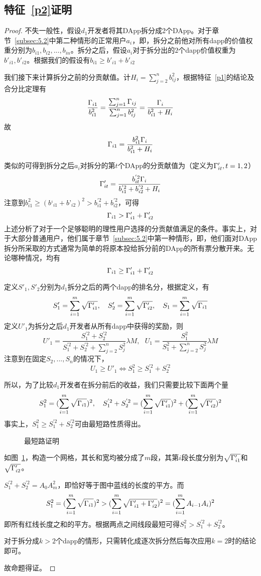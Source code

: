 \subsection{特征~\ref{p2}证明}
\label{subsection:proof2}
\begin{proof}
	 不失一般性，假设$d_1$开发者将其DApp拆分成2个DApp。对于章节~\ref{subsec:5.2}中第二种情形的正常用户$a_i$，即，拆分之前他对所有dapp的价值权重分别为$b_{i1},b_{i2},...,b_{in}$。拆分之后，假设$a_i$对于拆分出的$2$个dapp价值权重为$b'_{i1},b'_{i2}$。根据我们的假设有$b_{i1} \geq b'_{i1}+b'_{i2}$

	 我们接下来计算拆分之前的分贡献值。计$H_i = \sum_{j=2}^n b_{ij}^2$，根据特征~\ref{p1}的结论及合分比定理有
	 $$\frac{\Gamma_{i1}}{b_{i1}^2} = \frac{\sum_{j=1}^n \Gamma_{ij}}{\sum_{j=1}^n b_{ij}^2} = \frac{\Gamma_i}{b_{i1}^2+H_i}$$
	 故
	 $$\Gamma_{i1}=\frac{b_{i1}^2\Gamma_i}{b_{i1}^2+H_i}$$

     类似的可得到拆分之后$a_i$对拆分的第$t$个DApp的分贡献值为（定义为$\Gamma'_{it},t=1,2$）
	 $$\Gamma'_{it} =  \frac{b_{it}^{'2}\Gamma_i}{b_{i1}^{'2}+b_{i2}^{'2}+H_i}$$
	 注意到$b_{i1}^2 \geq (b‘_{i1}+b’_{i2})^2 >b_{i1}^{'2}+b_{i2}^{'2}$，可得
	 $$\Gamma_{i1} > \Gamma'_{i1}+\Gamma'_{i2}$$
	 上述分析了对于一个足够聪明的理性用户选择的分贡献值满足的条件。事实上，对于大部分普通用户，他们属于章节~\ref{subsec:5.2}中第一种情形，即，他们面对DApp拆分所采取的方式通常为简单的将原本投给拆分前的DApp的所有票分散开来。无论哪种情况，均有
	 	$$\Gamma_{i1} \geq \Gamma'_{i1}+\Gamma'_{i2}$$

	 定义$S'_1,S'_2$分别为$d_1$拆分之后的两个dapp的排名分，根据定义，有
	 $$S'_1 =  \sum_{i=1}^m \sqrt{\Gamma'_{i1}},~~~S'_2 =  \sum_{i=1}^m \sqrt{\Gamma'_{i2}},~~~S_1 = \sum_{i=1}^m \sqrt{\Gamma_{i1}}$$
	 定义$U'_1$为拆分之后$d_1$开发者从所有dapp中获得的奖励，则
	 $$U'_1=\frac{S_1^{'2}+S_2^{'2}}{S_1^{'2}+S_2^{'2}+\sum_{j=2}^n S_j^2} \lambda M,~~~U_1=\frac{S^2_1}{S_1^2+\sum_{j=2}^n S_j^2} \lambda M$$
	 注意到在固定$S_2,...,S_n$的情况下，
	 $$ U_1 \geq U'_1 \Leftrightarrow S_1^2 \geq S_1^{'2}+S_2^{'2}$$

	 所以，为了比较$d_1$开发者在拆分前后的收益，我们只需要比较下面两个量
	 $$S_1^2 = (\sum_{i=1}^m \sqrt{\Gamma_{i1}})^2,~~~S_1^{'2}+S_2^{'2}=  (\sum_{i=1}^m \sqrt{\Gamma'_{i1}})^2+(\sum_{i=1}^m \sqrt{\Gamma'_{i2}})^2$$
	 事实上，$S_1^2 \geq S_1^{'2}+S_2^{'2}$可由最短路性质得出。
	 \begin{figure}
	 	\centering
    
	 	\caption{最短路证明 \label{fig:path}}
	 \end{figure}
	 如图~\ref{fig:path}，构造一个网格，其长和宽均被分成了$m$段，其第$i$段长度分别为$\sqrt{\Gamma'_{i1}}$和$\sqrt{\Gamma'_{i2}}$。

	 $S_1^{'2}+S_2^{'2}=A_0A_m^2$，即恰好等于图中蓝线的长度的平方。而
	 $$S_1^2 = (\sum_{i=1}^m \sqrt{\Gamma_{i1}})^2 > (\sum_{i=1}^m \sqrt{\Gamma'_{i1}+\Gamma'_{i2}})^2 = (\sum_{i=1}^m A_{i-1}A_i)^2$$
	 即所有红线长度之和的平方。根据两点之间线段最短可得$S_1^2 >S_1^{'2}+S_2^{'2}$。

	 对于拆分成$k>2$个dapp的情形，只需转化成逐次拆分然后每次应用$k=2$时的结论即可。

	 故命题得证。
\end{proof}

